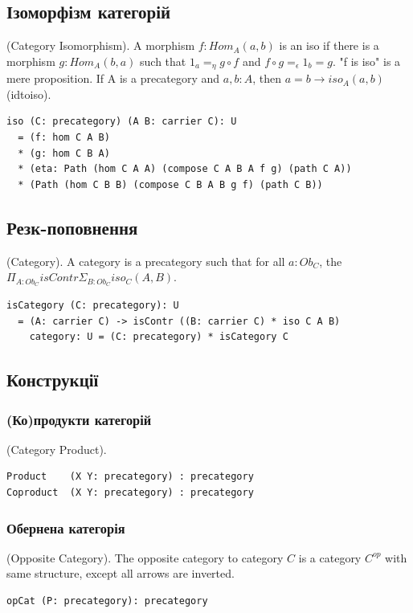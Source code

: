 \begin{definition}
\subsection{Ізоморфізм категорій}
\begin{definition} (Category Isomorphism).
A morphism $f : Hom_A(a,b)$ is an iso
if there is a morphism $g: Hom_A(b,a)$ such that
$1_a =_\eta g \circ f$ and
$f \circ g =_\epsilon 1_b = g$. "f is iso" is
a mere proposition.
If A is a precategory and $a,b: A$,
then $a = b \rightarrow iso_A(a,b)$ (idtoiso).
\begin{lstlisting}
iso (C: precategory) (A B: carrier C): U
  = (f: hom C A B)
  * (g: hom C B A)
  * (eta: Path (hom C A A) (compose C A B A f g) (path C A))
  * (Path (hom C B B) (compose C B A B g f) (path C B))
\end{lstlisting}
\end{definition}

\subsection{Резк-поповнення}
\begin{definition} (Category).
A category is a precategory
such that for all $a:Ob_C$, the $\Pi_{A:Ob_C} isContr \Sigma_{B:Ob_C} iso_C(A,B)$.
\begin{lstlisting}
isCategory (C: precategory): U
  = (A: carrier C) -> isContr ((B: carrier C) * iso C A B)
    category: U = (C: precategory) * isCategory C
\end{lstlisting}
\end{definition}

\subsection{Конструкції}

\subsubsection{(Ко)продукти категорій}
\begin{definition} (Category Product).
\begin{lstlisting}
Product    (X Y: precategory) : precategory
Coproduct  (X Y: precategory) : precategory
\end{lstlisting}
\end{definition}

\subsubsection{Обернена категорія}
\begin{definition} (Opposite Category). The opposite category to category $C$
is a category $C^{op}$ with same structure, except all arrows are inverted.
\begin{lstlisting}
opCat (P: precategory): precategory
\end{lstlisting}
\end{definition}


\end{definition}
